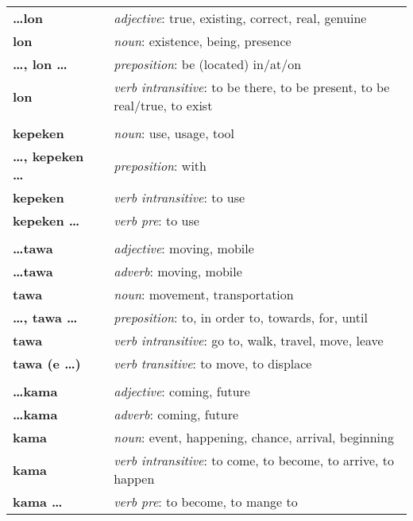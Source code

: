 \begin{supertabular}{p{2,5cm}|ll}
\textbf{\dots lon} && \textit{adjective}: true, existing, correct, real, genuine \\ %
\textbf{lon} && \textit{noun}: existence, being, presence \\ %
\textbf{\dots , lon \dots} && \textit{preposition}: be (located) in/at/on \\ %
\textbf{lon} && \textit{verb intransitive}: to be there, to be present, to be real/true, to exist \\ %
 && \\ %
\textbf{kepeken} && \textit{noun}: use, usage, tool \\ %
\textbf{\dots , kepeken \dots} && \textit{preposition}: with \\ %
\textbf{kepeken} && \textit{verb intransitive}: to use \\ %
\textbf{kepeken \dots} && \textit{verb pre}: to use \\ %
 && \\ %
\textbf{\dots tawa} && \textit{adjective}: moving, mobile \\ %
\textbf{\dots tawa} && \textit{adverb}: moving, mobile \\ %
\textbf{tawa} && \textit{noun}: movement, transportation \\ %
\textbf{\dots , tawa \dots} && \textit{preposition}: to, in order to, towards, for, until \\ %
\textbf{tawa} && \textit{verb intransitive}: go to, walk, travel, move, leave \\ %
\textbf{tawa (e \dots)} && \textit{verb transitive}: to move, to displace \\ %
 && \\ %
\textbf{\dots kama} && \textit{adjective}: coming, future \\ %
\textbf{\dots kama} && \textit{adverb}: coming, future \\ %
\textbf{kama} && \textit{noun}: event, happening, chance, arrival, beginning \\ %
\textbf{kama} && \textit{verb intransitive}: to come, to become, to arrive, to happen \\ %
\textbf{kama \dots} && \textit{verb pre}: to become, to mange to \\ %

\end{supertabular}
